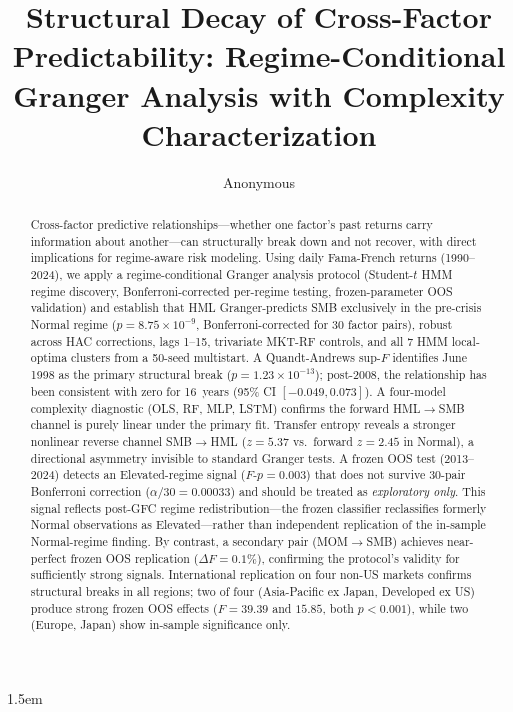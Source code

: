 \documentclass[sigconf,anonymous]{acmart}
\begin{document}
\sloppy
\emergencystretch 1.5em

\title{Structural Decay of Cross-Factor Predictability: Regime-Conditional Granger Analysis with Complexity Characterization}

\author{Anonymous}

\begin{abstract}
Cross-factor predictive relationships---whether one factor's past
returns carry information about another---can structurally break down
and not recover, with direct implications for regime-aware risk modeling.
Using daily Fama-French returns (1990--2024), we apply a
regime-conditional Granger analysis protocol (Student-$t$ HMM regime
discovery, Bonferroni-corrected per-regime testing, frozen-parameter
OOS validation) and establish that HML Granger-predicts SMB
exclusively in the pre-crisis Normal regime
($p = 8.75 \times 10^{-9}$, Bonferroni-corrected for 30 factor pairs),
robust across HAC corrections, lags 1--15, trivariate MKT-RF controls,
and all 7 HMM local-optima clusters from a 50-seed multistart.
A Quandt-Andrews sup-$F$ identifies June 1998 as the primary
structural break ($p = 1.23 \times 10^{-13}$); post-2008, the
relationship has been consistent with zero for 16~years
(95\% CI $[-0.049, 0.073]$).
A four-model complexity diagnostic (OLS, RF, MLP, LSTM) confirms
the forward HML$\to$SMB channel is purely linear under the primary fit.
Transfer entropy reveals a stronger nonlinear reverse
channel SMB$\to$HML ($z = 5.37$ vs.\ forward $z = 2.45$ in Normal),
a directional asymmetry invisible to standard Granger tests.
A frozen OOS test (2013--2024) detects an Elevated-regime signal
($F$-$p = 0.003$) that does not survive 30-pair Bonferroni correction
($\alpha/30 = 0.00033$) and should be treated as \emph{exploratory only}.
This signal reflects post-GFC regime redistribution---the frozen
classifier reclassifies formerly Normal observations as Elevated---rather
than independent replication of the in-sample Normal-regime finding.
By contrast, a secondary pair (MOM$\to$SMB) achieves near-perfect
frozen OOS replication ($\Delta F = 0.1\%$), confirming the protocol's
validity for sufficiently strong signals.
International replication on four non-US markets confirms
structural breaks in all regions; two of four (Asia-Pacific ex Japan,
Developed ex US) produce strong frozen OOS effects
($F = 39.39$ and $15.85$, both $p < 0.001$), while two
(Europe, Japan) show in-sample significance only.
\end{abstract}
\end{document}
